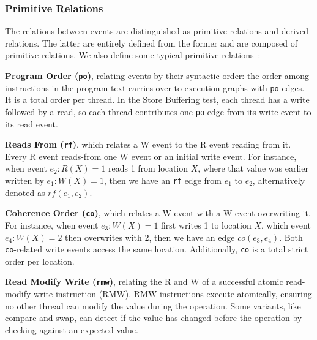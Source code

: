 \subsubsection{Primitive Relations}

The relations between events are distinguished as primitive relations and derived relations. The latter are entirely defined from the former and are composed of primitive relations. We also define some typical primitive relations~\citep{10.1145/2627752}:

\textbf{Program Order (\texttt{po})}, relating events by their syntactic order: the order among instructions in the program text carries over to execution graphs with \texttt{po} edges. It is a total order per thread. In the Store Buffering test, each thread has a write followed by a read, so each thread contributes one \texttt{po} edge from its write event to its read event.

\textbf{Reads From (\texttt{rf})}, which relates a W event to the R event reading from it. Every R event reads-from one W event or an initial write event. For instance, when event $e_2 : R(X) = 1$ reads 1 from location $X$, where that value was earlier written by $e_1 : W(X) = 1$, then we have an \texttt{rf} edge from $e_1$ to $e_2$, alternatively denoted as $\mathit{rf}(e_1, e_2)$.

\textbf{Coherence Order (\texttt{co})}, which relates a W event with a W event overwriting it. For instance, when event $e_3 : W(X)=1$ first writes 1 to location $X$, which event $e_4 : W(X)=2$ then overwrites with 2, then we have an edge $\mathit{co}(e_3, e_4)$. Both \texttt{co}-related write events access the same location. Additionally, \texttt{co} is a total strict order per location.

\textbf{Read Modify Write (\texttt{rmw})}, relating the R and W of a successful atomic read-modify-write instruction (RMW). RMW instructions execute atomically, ensuring no other thread can modify the value during the operation. Some variants, like compare-and-swap, can detect if the value has changed before the operation by checking against an expected value.

